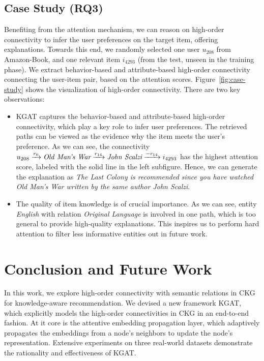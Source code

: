 \documentclass[sigconf]{acmart}
\theoremstyle{definition}
\begin{document}
\subsection{Case Study (RQ3)}\label{sec:visualization}
Benefiting from the attention mechanism, we can reason on high-order connectivity to infer the user preferences on the target item, offering explanations.
Towards this end, we randomly selected one user $u_{208}$ from Amazon-Book, and one relevant item $i_{4293}$ (from the test, unseen in the training phase).
We extract behavior-based and attribute-based high-order connectivity connecting the user-item pair, based on the attention scores.
Figure~\ref{fig:case-study} shows the visualization of high-order connectivity. There are two key observations:
\begin{itemize}[leftmargin=*]
    \item KGAT captures the behavior-based and attribute-based high-order connectivity, which play a key role to infer user preferences.
    The retrieved paths can be viewed as the evidence why the item meets the user's preference. As we can see, the connectivity $u_{208}\xrightarrow{r_0} \emph{Old Man's War}\xrightarrow{r_{14}} \emph{John Scalzi}\xrightarrow{-r_{14}} i_{4293}$ has the highest attention score, labeled with the solid line in the left subfigure.
    Hence, we can generate the explanation as \emph{The Last Colony is recommended since you have watched Old Man's War written by the same author John Scalzi}.
    
    \item The quality of item knowledge is of crucial importance. As we can see, entity \emph{English} with relation \emph{Original Language} is involved in one path, which is too general to provide high-quality explanations. This inspires us to perform hard attention to filter less informative entities out in future work. 
\end{itemize}














%
 \section{Conclusion and Future Work}

In this work, we explore high-order connectivity with semantic relations in CKG for knowledge-aware recommendation.
We devised a new framework KGAT, which explicitly models the high-order connectivities in CKG in an end-to-end fashion.
At it core is the attentive embedding propagation layer, which adaptively propagates the embeddings from a node's neighbors to update the node's representation.
Extensive experiments on three real-world datasets demonstrate the rationality and effectiveness of KGAT.
\end{document}
